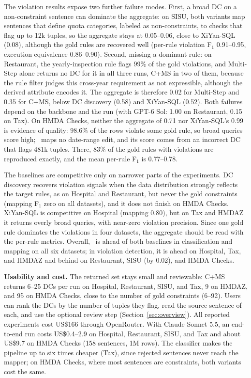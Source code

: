 The violation results expose two further failure modes. First, a broad DC on a non-constraint sentence can dominate the aggregate: on SISU, both variants map sentences that define quota categories, labeled as non-constraints, to checks that flag up to 12k tuples, so the aggregate stays at 0.05--0.06, close to XiYan-SQL (0.08), although the gold rules are recovered well (per-rule violation F$_1$ 0.91--0.95, execution equivalence 0.86--0.90). Second, missing a dominant rule: on Restaurant, the yearly-inspection rule flags 99\% of the gold violations, and Multi-Step alone returns no DC for it in all three runs, C+MS in two of them, because the rule filter judges this cross-year requirement as not expressible, although the derived attribute encodes it. The aggregate is therefore 0.02 for Multi-Step and 0.35 for C+MS, below DC discovery (0.58) and XiYan-SQL (0.52). Both failures depend on the backbone and the run (with GPT-6 Sol: 1.00 on Restaurant, 0.15 on Tax). On HMDA Checks, neither the aggregate of 0.71 nor XiYan-SQL's 0.99 is evidence of quality: 98.6\% of the rows violate some gold rule, so broad queries score high; \system\ maps no date-range edit, and its score comes from an incorrect DC that flags 481k tuples. There, 83\% of the gold rules with violations are reproduced exactly, and the mean per-rule F$_1$ is 0.77--0.78.

The baselines are competitive only on narrower parts of the experiments. DC discovery recovers violation signals when the data distribution strongly reflects the target rules, as on Hospital and Restaurant, but never the gold constraints (mapping F$_1$ zero on all datasets), and it does not finish on HMDA Checks. XiYan-SQL is competitive on Hospital (mapping 0.80), but on Tax and HMDAZ it returns overly broad queries, with near-zero violation precision. Since one gold rule dominates the violations in four datasets, the aggregate should be read with the per-rule metrics. Overall, \system\ is ahead of both baselines in classification and mapping on all six datasets; in violation detection, it is ahead on Hospital, Tax, and HMDAZ and behind on Restaurant, SISU (by 0.02), and HMDA Checks.

\smallskip\noindent\textbf{Usability and cost.}
The returned set stays small and reviewable: C+MS returns 6--25 DCs per run on Hospital, Restaurant, SISU, and Tax, 9 on HMDAZ, and 95 on HMDA Checks, close to the number of gold constraints (6--92). Users can rank the DCs by the number of tuples they flag, read the source sentence of each, and use the optional review step (Section~\ref{sec:overview}).
All reported experiments cost US\$166 through OpenRouter. With Claude Sonnet 5.5, an end-to-end run costs US\$0.4--2.9 on Hospital, Restaurant, SISU, and Tax and about US\$9.7 on HMDA Checks (158 sentences, 1M rows). The classifier makes the pipeline up to six times cheaper (Tax), since rejected sentences never reach the mapper; on HMDA Checks, where most sentences are constraints, both variants cost the same.
